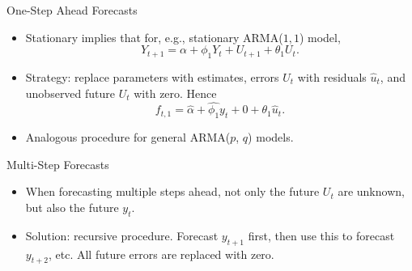 \begin{frame}{One-Step Ahead Forecasts}
\begin{itemize}
\item Stationary implies that for, e.g.,
stationary ARMA($1,1$)
model,
\[
Y_{t+1}=\alpha +\phi _{1}Y_{t}+U_{t+1}+\theta_{1}U_{t}.
\]
\item Strategy: replace parameters with estimates, errors $U_t$ with residuals $\hat{u}_t$, and unobserved future $U_t$ with zero. Hence
\[
f_{t,1}=\hat\alpha +\widehat{\phi _{1}}y_{t}+0+\theta_{1}\hat{u}_{t}.
\]
\item Analogous procedure for general ARMA($p$, $q$) models.
\end{itemize}
\end{frame}
\begin{frame}{Multi-Step Forecasts}
\begin{itemize}
\item When forecasting multiple steps ahead, not only the future $U_t$ are unknown, but also the future $y_t$.
\item Solution: recursive procedure. Forecast $y_{t+1}$ first, then use this to forecast $y_{t+2}$, etc. All future errors are replaced with zero.
\end{itemize}
\end{frame}

